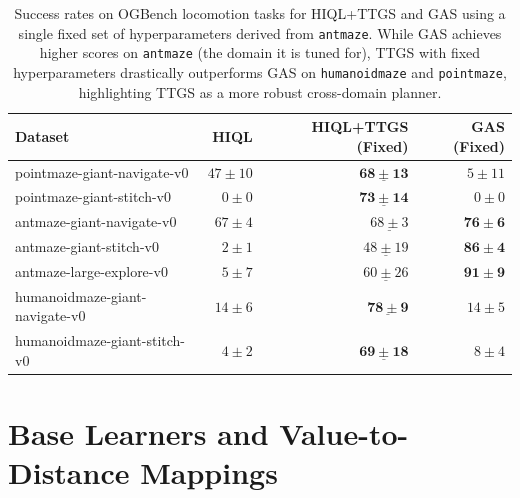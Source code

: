 \documentclass{article} %
\begin{document}
\begin{table}[H]
  \centering
  \caption{Success rates on OGBench locomotion tasks for HIQL+TTGS and GAS using a single fixed set of hyperparameters derived from \texttt{antmaze}. While GAS achieves higher scores on \texttt{antmaze} (the domain it is tuned for), TTGS with fixed hyperparameters drastically outperforms GAS on \texttt{humanoidmaze} and \texttt{pointmaze}, highlighting TTGS as a more robust cross-domain planner.}
  \label{tab:ttgs-gas-fixed}
  \begin{tabular}{lrrr}
    \toprule
    Dataset & HIQL & HIQL+TTGS (Fixed) & GAS (Fixed) \\
    \midrule
    pointmaze-giant-navigate-v0    & $47 \pm 10$ & $\mathbf{\underline{68 \pm 13}}$ & $5 \pm 11$ \\
    pointmaze-giant-stitch-v0      & $0 \pm 0$   & $\mathbf{\underline{73 \pm 14}}$ & $0 \pm 0$ \\
    \midrule
    antmaze-giant-navigate-v0      & $67 \pm 4$  & $\underline{68 \pm 3}$  & $\mathbf{76 \pm 6}$ \\
    antmaze-giant-stitch-v0        & $2 \pm 1$   & $\underline{48 \pm 19}$ & $\mathbf{86 \pm 4}$ \\
    antmaze-large-explore-v0       & $5 \pm 7$   & $\underline{60 \pm 26}$ & $\mathbf{91 \pm 9}$ \\
    \midrule
    humanoidmaze-giant-navigate-v0 & $14 \pm 6$  & $\mathbf{\underline{78 \pm 9}}$  & $14 \pm 5$ \\
    humanoidmaze-giant-stitch-v0   & $4 \pm 2$   & $\mathbf{\underline{69 \pm 18}}$ & $8 \pm 4$ \\
    \bottomrule
  \end{tabular}
\end{table}

\section{Base Learners and Value-to-Distance Mappings} \label{apdx:value_distance}
\end{document}
